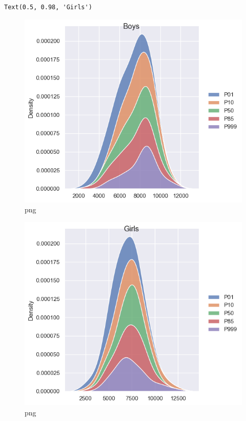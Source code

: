 \documentclass[
]{article}
\begin{document}
\begin{verbatim}
Text(0.5, 0.98, 'Girls')
\end{verbatim}

\begin{figure}
\centering
\includegraphics{output_34_1.png}
\caption{png}
\end{figure}

\begin{figure}
\centering
\includegraphics{output_34_2.png}
\caption{png}
\end{figure}
\end{document}
